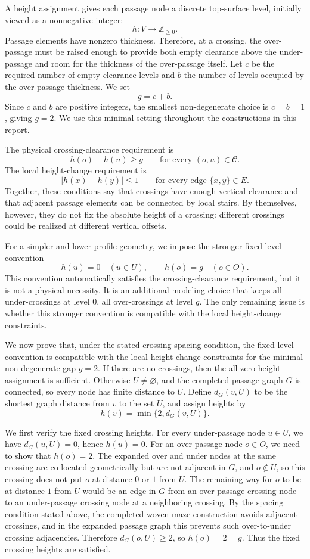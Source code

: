 \documentclass[acmsmall,screen,nonacm]{acmart}
\begin{document}
A height assignment gives each passage node a discrete top-surface
level, initially viewed as a nonnegative integer:
\[
h:V\to \mathbb{Z}_{\ge 0}.
\]
Passage elements have nonzero thickness. Therefore, at a crossing, the
over-passage must be raised enough to provide both empty clearance
above the under-passage and room for the thickness of the over-passage
itself.  Let \(c\) be the required number of empty clearance levels
and \(b\) the number of levels occupied by the over-passage
thickness. We set
\[
g=c+b.
\]
Since \(c\) and \(b\) are positive integers, the smallest
non-degenerate choice is \(c=b=1\), giving \(g=2\). We use this
minimal setting throughout the constructions in this report.

The physical crossing-clearance requirement is
\[
h(o)-h(u)\ge g
\qquad\text{for every }(o,u)\in\mathcal{C}.
\]
The local height-change requirement is
\[
|h(x)-h(y)|\le 1
\qquad\text{for every edge }\{x,y\}\in E.
\]
Together, these conditions say that crossings have enough vertical
clearance and that adjacent passage elements can be connected by local
stairs. By themselves, however, they do not fix the absolute height of
a crossing: different crossings could be realized at different
vertical offsets.

For a simpler and lower-profile geometry, we impose the stronger
fixed-level convention
\[
h(u)=0 \quad (u\in U),
\qquad
h(o)=g \quad (o\in O).
\]
This convention automatically satisfies the crossing-clearance
requirement, but it is not a physical necessity. It is an additional
modeling choice that keeps all under-crossings at level \(0\), all
over-crossings at level \(g\). The only remaining issue is whether
this stronger convention is compatible with the local height-change
constraints.

We now prove that, under the stated crossing-spacing condition, the
fixed-level convention is compatible with the local height-change
constraints for the minimal non-degenerate gap \(g=2\). If there are
no crossings, then the all-zero height assignment is sufficient.
Otherwise \(U\neq\varnothing\), and the completed passage graph \(G\)
is connected, so every node has finite distance to \(U\). Define
\(d_G(v,U)\) to be the shortest graph distance from \(v\) to the set
\(U\), and assign heights by
\[
h(v)=\min\{2,d_G(v,U)\}.
\]

We first verify the fixed crossing heights. For every under-passage
node \(u\in U\), we have \(d_G(u,U)=0\), hence \(h(u)=0\). For an
over-passage node \(o\in O\), we need to show that \(h(o)=2\). The
expanded over and under nodes at the same crossing are co-located
geometrically but are not adjacent in \(G\), and \(o\notin U\), so
this crossing does not put \(o\) at distance \(0\) or \(1\) from
\(U\). The remaining way for \(o\) to be at distance \(1\) from \(U\)
would be an edge in \(G\) from an over-passage crossing node to an
under-passage crossing node at a neighboring crossing. By the spacing
condition stated above, the completed woven-maze construction avoids
adjacent crossings, and in the expanded passage graph this prevents
such over-to-under crossing
adjacencies. Therefore \(d_G(o,U)\ge 2\), so \(h(o)=2=g\). Thus the
fixed crossing heights are satisfied.
\end{document}
